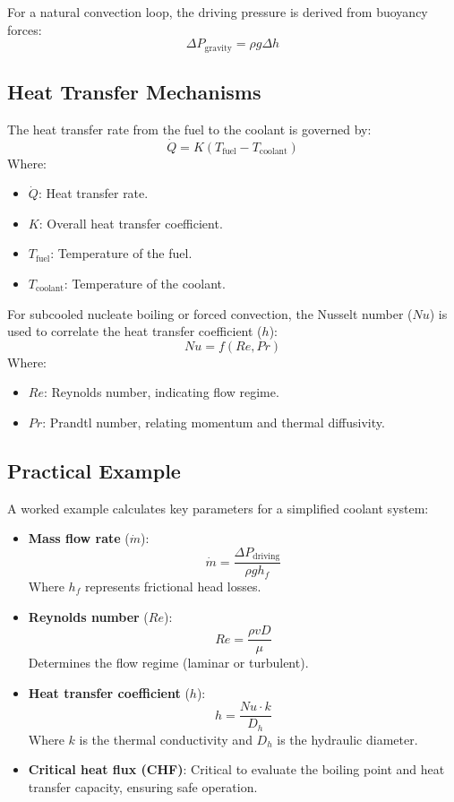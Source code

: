 For a natural convection loop, the driving pressure is derived from buoyancy forces:
\[
\Delta P_{\text{gravity}} = \rho g \Delta h
\]

\subsection{Heat Transfer Mechanisms}
The heat transfer rate from the fuel to the coolant is governed by:
\[
\dot{Q} = K(T_{\text{fuel}} - T_{\text{coolant}})
\]
Where:
\begin{itemize}
    \item \( \dot{Q} \): Heat transfer rate.
    \item \( K \): Overall heat transfer coefficient.
    \item \( T_{\text{fuel}} \): Temperature of the fuel.
    \item \( T_{\text{coolant}} \): Temperature of the coolant.
\end{itemize}

For subcooled nucleate boiling or forced convection, the Nusselt number (\( Nu \)) is used to correlate the heat transfer coefficient (\( h \)):
\[
Nu = f(Re, Pr)
\]
Where:
\begin{itemize}
    \item \( Re \): Reynolds number, indicating flow regime.
    \item \( Pr \): Prandtl number, relating momentum and thermal diffusivity.
\end{itemize}

\subsection{Practical Example}
A worked example calculates key parameters for a simplified coolant system:
\begin{itemize}
    \item \textbf{Mass flow rate} (\( \dot{m} \)):
    \[
    \dot{m} = \frac{\Delta P_{\text{driving}}}{\rho g h_f}
    \]
    Where \( h_f \) represents frictional head losses.
    
    \item \textbf{Reynolds number} (\( Re \)):
    \[
    Re = \frac{\rho v D}{\mu}
    \]
    Determines the flow regime (laminar or turbulent).
    
    \item \textbf{Heat transfer coefficient} (\( h \)):
    \[
    h = \frac{Nu \cdot k}{D_h}
    \]
    Where \( k \) is the thermal conductivity and \( D_h \) is the hydraulic diameter.
    
    \item \textbf{Critical heat flux (CHF)}:
    Critical to evaluate the boiling point and heat transfer capacity, ensuring safe operation.
\end{itemize}


